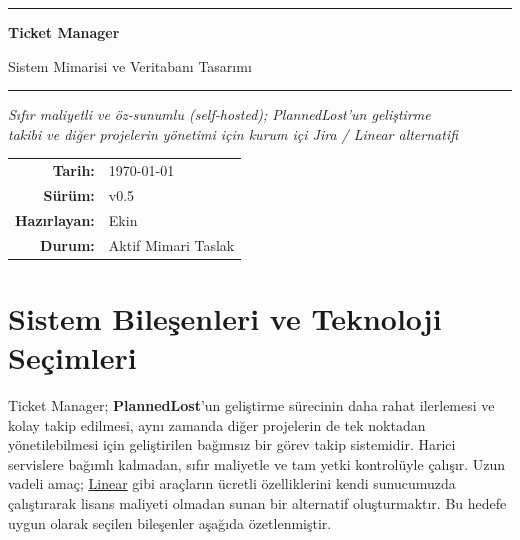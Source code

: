 \documentclass[11pt,a4paper]{article}
\begin{document}
\begin{titlepage}
\centering
\vspace*{2cm}
{\color{accent}\rule{0.6\textwidth}{1pt}}
\vspace{0.8cm}

{\Huge \bfseries Ticket Manager\par}

\vspace{0.4cm}
{\Large \color{darkgray} Sistem Mimarisi ve Veritabanı Tasarımı\par}

\vspace{0.8cm}
{\color{accent}\rule{0.6\textwidth}{1pt}}
\vspace{1.2cm}

{\large \itshape Sıfır maliyetli ve öz-sunumlu (self-hosted); PlannedLost'un geliştirme\\
takibi ve diğer projelerin yönetimi için kurum içi Jira / Linear alternatifi\par}

\vspace{2cm}
{\normalsize
\begin{tabular}{rl}
\textbf{Tarih:}     & \today \\
\textbf{Sürüm:}     & v0.5 \\
\textbf{Hazırlayan:}& Ekin \\
\textbf{Durum:}     & Aktif Mimari Taslak \\
\end{tabular}\par}
\vfill
\end{titlepage}

\tableofcontents
\newpage
{}

\section{Sistem Bileşenleri ve Teknoloji Seçimleri}

Ticket Manager; \textbf{PlannedLost}'un geliştirme sürecinin daha rahat
ilerlemesi ve kolay takip edilmesi, aynı zamanda diğer projelerin de tek
noktadan yönetilebilmesi için geliştirilen bağımsız bir görev takip
sistemidir. Harici servislere bağımlı kalmadan, sıfır maliyetle ve tam
yetki kontrolüyle çalışır. Uzun vadeli amaç;
\href{https://linear.app/}{Linear} gibi araçların ücretli özelliklerini
kendi sunucumuzda çalıştırarak lisans maliyeti olmadan sunan bir
alternatif oluşturmaktır. Bu hedefe uygun olarak seçilen bileşenler
aşağıda özetlenmiştir.
\end{document}
